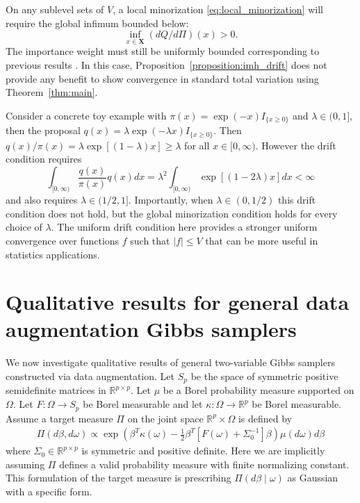 \documentclass[ejsv2, noshowframe]{imsart}
\theoremstyle{plain}
\theoremstyle{definition}
\theoremstyle{remark}
\newcommand{\w}{\omega}
\newcommand{\R}{\mathbb{R}}
\newcommand{\X}{\textbf{X}}
\begin{document}
On any sublevel sets of $V$, a local minorization \ref{eq:local_minorization} will require the global infimum bounded below:
\[
\inf_{x \in \X} (dQ/d\Pi)(x) > 0.
\] 
The importance weight must still be uniformly bounded corresponding to previous results \citep{mengersen:tweedie:1996}.
In this case, Proposition~\ref{proposition:imh_drift} does not provide any benefit to show convergence in standard total variation using Theorem~\ref{thm:main}.

Consider a concrete toy example with $\pi(x) = \exp(-x) I_{\{ x \ge 0 \} }$ and $\lambda \in (0, 1]$, then the proposal $q(x) = \lambda \exp(-\lambda x) I_{ \{ x \ge 0 \} }$.
Then $q(x)/\pi(x) = \lambda \exp[( 1 - \lambda )x] \ge \lambda$ for all $x \in [0, \infty)$.
However the drift condition requires
\[
\int_{[0, \infty)} \frac{q(x)}{\pi(x)} q(x) dx
= \lambda^2 \int_{[0, \infty)} \exp[(1 - 2\lambda) x] dx < \infty
\]
and also requires $\lambda \in (1/2, 1]$.
Importantly, when $\lambda \in (0, 1/2)$ this drift condition does not hold, but the global minorization condition holds for every choice of $\lambda$.
The uniform drift condition here provides a stronger uniform convergence over functions $f$ such that $|f| \le V$ that can be more useful in statistics applications.


\section{Qualitative results for general data augmentation Gibbs samplers} \label{example:general_data_augmentation}

We now investigate qualitative results of general two-variable Gibbs samplers constructed via data augmentation.
Let $S_p$ be the space of symmetric positive semidefinite matrices in $\R^{p \times p}$.
Let $\mu$ be a Borel probability measure supported on $\Omega$.
Let $F : \Omega \to S_p$ be Borel measurable and let $\kappa : \Omega \to \R^p$ be Borel measurable.
Assume a target measure $\Pi$ on the joint space $\R^p \times \Omega$ is defined by
\begin{align}
\Pi(d\beta, d\w)
\propto \exp\left( \beta^T \kappa(\w) -\frac{1}{2} \beta^T \left[ F(\w) + \Sigma_0^{-1} \right] \beta \right) \mu(d\w) d\beta
\label{eq:general_posterior_form}
\end{align}
where $\Sigma_0 \in \R^{p \times p}$ is symmetric and positive definite.
Here we are implicitly assuming $\Pi$ defines a valid probability measure with finite normalizing constant.
This formulation of the target measure is prescribing $\Pi(d\beta \mid \w)$ as Gaussian with a specific form.
\end{document}
